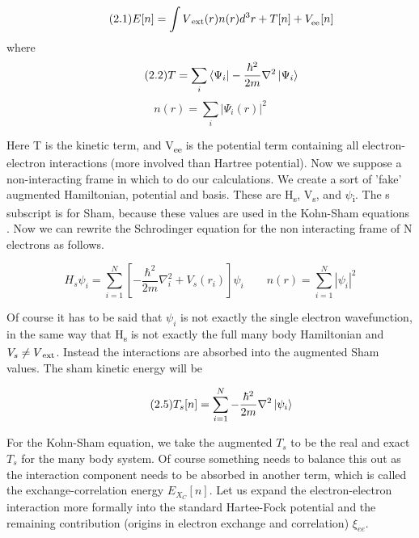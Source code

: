 \documentclass[12pt]{article}
\begin{document}
\begin{equation} \label{2.1} \tag{2.1}
E[n]=\int V\textsubscript{ext}(r)n(r)d^3r + T[n] + V_\textsubscript{ee}[n]
\end{equation}
where 
\begin{equation} \label{2.2} \tag{2.2}
T=\sum_{i} \bra{\Psi_i}-\frac{\hbar^2}{2m}\nabla ^2 \ket{\Psi_i} 
\end{equation}
\begin{equation} \label{2.3} \tag{2.3}
n(r)=\sum_{i} | \Psi_i(r) |^2 
\end{equation}

Here T is the kinetic term, and V\textsubscript{ee} is the potential term containing all electron-electron interactions (more involved than Hartree potential). Now we suppose a non-interacting frame in which to do our calculations. We create a sort of 'fake' augmented Hamiltonian, potential and basis. These are H\textsubscript{s}, V\textsubscript{s}, and $\psi$\textsubscript{i}. The s subscript is for Sham, because these values are used in the Kohn-Sham equations \cite{inhom}. Now we can rewrite the Schrodinger equation for the non interacting frame of N electrons as follows.

\begin{equation} \label{2.4} \tag{2.4}
H_s\psi_i = \sum_{i=1}^{N} [-\frac{\hbar^2}{2m}\nabla_i ^2 + V_s(r_i)] \psi_i \qquad n(r)=\sum_{i=1}^{N} |\psi_i|^2 
\end{equation}

Of course it has to be said that $\psi_i$ is not exactly the single electron wavefunction, in the same way that H\textsubscript{s} is not exactly the full many body Hamiltonian and $V_s \neq V\textsubscript{ext}$. Instead the interactions are absorbed into the augmented Sham values. The sham kinetic energy will be

\begin{equation} \label{2.5} \tag{2.5}
T_s[n]=\sum_{i=1}^{N} -\frac{\hbar^2}{2m}\nabla^2\ket{\psi_i}
\end{equation}

For the Kohn-Sham equation, we take the augmented $T_s$ to be the real and exact $T_s$ for the many body system. Of course something needs to balance this out as the interaction component needs to be absorbed in another term, which is called the exchange-correlation energy $E_X_C[n]$. Let us expand the electron-electron interaction more formally into the standard Hartee-Fock potential and the remaining contribution (origins in electron exchange and correlation) $\xi_{ee}$.
\end{document}
